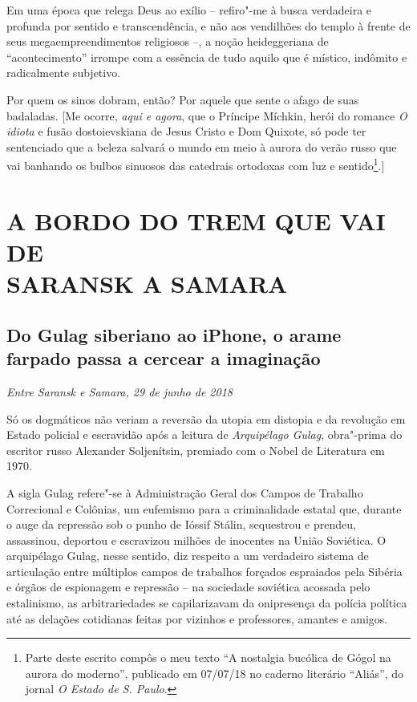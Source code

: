 Em uma época que relega Deus ao exílio -- refiro"-me à busca verdadeira e
profunda por sentido e transcendência, e não aos vendilhões do templo à
frente de seus megaempreendimentos religiosos --, a noção heideggeriana
de ``acontecimento'' irrompe com a essência de tudo aquilo que é
místico, indômito e radicalmente subjetivo.

Por quem os sinos dobram, então? Por aquele que sente o afago de suas
badaladas. {[}Me ocorre, \emph{aqui e agora}, que o Príncipe Míchkin,
herói do romance \emph{O idiota} e fusão dostoievskiana de Jesus Cristo
e Dom Quixote, só pode ter sentenciado que a beleza salvará o mundo em
meio à aurora do verão russo que vai banhando os bulbos sinuosos das
catedrais ortodoxas com luz e sentido\footnote{Parte deste escrito
  compôs o meu texto ``A nostalgia bucólica de Gógol na aurora do
  moderno'', publicado em 07/07/18 no caderno literário ``Aliás'', do
  jornal \emph{O Estado de S. Paulo}.}.{]}

\clearpage{\pagestyle{empty}\cleardoublepage}
\movetooddpage
{}
\part*{A BORDO DO TREM QUE VAI DE\\SARANSK A SAMARA}

\chapter*{Do Gulag siberiano ao iPhone, o arame farpado passa a cercear a imaginação}

\begin{flushright}
\emph{Entre Saransk e Samara, 29 de junho de 2018}
\end{flushright}

Só os dogmáticos não veriam a reversão da utopia em distopia e da
revolução em Estado policial e escravidão após a leitura de
\emph{Arquipélago Gulag}, obra"-prima do escritor russo Alexander
Soljenítsin, premiado com o Nobel de Literatura em 1970.

A sigla Gulag refere"-se à Administração Geral dos Campos de Trabalho
Correcional e Colônias, um eufemismo para a criminalidade estatal que,
durante o auge da repressão sob o punho de Ióssif Stálin, sequestrou e
prendeu, assassinou, deportou e escravizou milhões de inocentes na União
Soviética. O arquipélago Gulag, nesse sentido, diz respeito a um
verdadeiro sistema de articulação entre múltiplos campos de trabalhos
forçados espraiados pela Sibéria e órgãos de espionagem e repressão --
na sociedade soviética acossada pelo estalinismo, as arbitrariedades se
capilarizavam da onipresença da polícia política até as delações
cotidianas feitas por vizinhos e professores, amantes e amigos.


